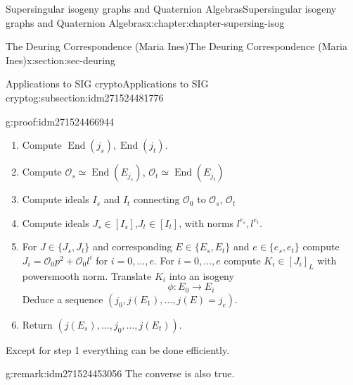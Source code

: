 \documentclass[oneside,10pt,]{book}
\numberwithin{equation}{section}
\newcommand{\lb}{[}
\newcommand{\rb}{]}
\newcommand{\ints}{\mathcal{O}}
\DeclareMathOperator{\End}{End}
\begin{document}
\begin{chapterptx}{Supersingular isogeny graphs and Quaternion Algebras}{}{Supersingular isogeny graphs and Quaternion Algebras}{}{}{x:chapter:chapter-supersing-isog}
\begin{sectionptx}{The Deuring Correspondence (Maria Ines)}{}{The Deuring Correspondence (Maria Ines)}{}{}{x:section:sec-deuring}
\begin{subsectionptx}{Applications to SIG crypto}{}{Applications to SIG crypto}{}{}{g:subsection:idm271524481776}
\begin{proofptx}{}{g:proof:idm271524466944}
\begin{enumerate}
\item{}Compute \(\End(j_s),\End(j_t)\).%
\item{}Compute \(\ints_s \simeq \End(E_{j_s})\), \(\ints_t \simeq \End(E_{j_t})\)%
\item{}Compute ideals \(I_s\) and \(I_t\) connecting \(\ints_0 \) to \(\ints_s\), \(\ints_t\)%
\item{}Compute ideals \(J_s \in \lb I_s \rb\),\(J_t \in \lb I_t \rb\), with norms \(l^{e_s},l^{e_t}\).%
\item{}For \(J \in \{J_s,J_t\}\) and corresponding \(E \in \{E_s,E_t\}\) and \(e\in \{e_s, e_t\}\) compute \(J_i = \ints_0 p^2 + \ints_0 l^i\) for \(i = 0,\ldots, e\). For \(i = 0,\ldots, e\) compute \(K_i \in \lb J_i \rb_L\) with powersmooth norm. Translate \(K_i\) into an isogeny%
\begin{equation*}
\phi\colon E_0 \to E_i
\end{equation*}
Deduce a sequence \((j_0, j(E_1),\ldots,j(E) = j_e)\).%
\item{}Return \((j(E_s), \ldots,j_0, \ldots,j(E_t))\).%
\end{enumerate}
%
\par
Except for step 1 everything can be done efficiently.%
\end{proofptx}
\begin{remark}{}{g:remark:idm271524453056}%
The converse is also true.%
\end{remark}
\end{subsectionptx}
\end{sectionptx}
\end{chapterptx}
%
%
\typeout{************************************************}
\typeout{************************************************}
%
\end{document}
